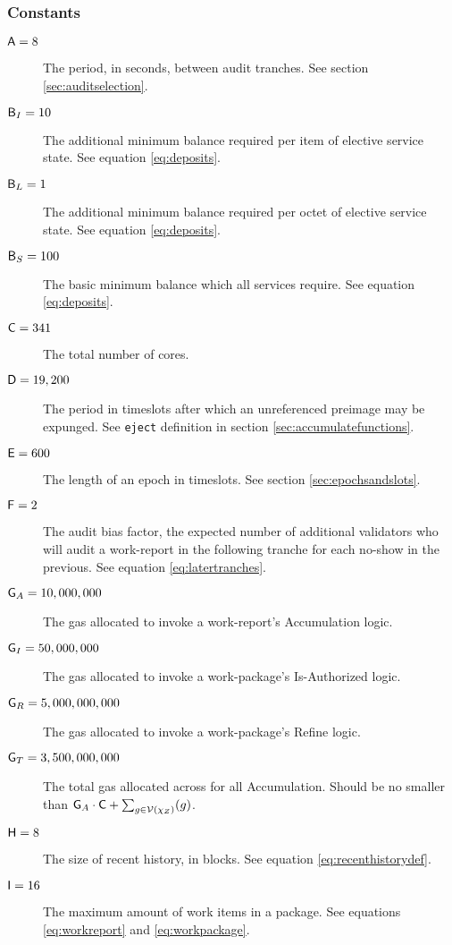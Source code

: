 \subsubsection{Constants}

\begin{description}
  \item[$\mathsf{A} = 8$] The period, in seconds, between audit tranches. See section \ref{sec:auditselection}.
  \item[$\mathsf{B}_I = 10$] The additional minimum balance required per item of elective service state. See equation \ref{eq:deposits}.
  \item[$\mathsf{B}_L = 1$] The additional minimum balance required per octet of elective service state. See equation \ref{eq:deposits}.
  \item[$\mathsf{B}_S = 100$] The basic minimum balance which all services require. See equation \ref{eq:deposits}.
  \item[$\mathsf{C} = 341$] The total number of cores.
  \item[$\mathsf{D} = 19,200$] The period in timeslots after which an unreferenced preimage may be expunged. See \texttt{eject} definition in section \ref{sec:accumulatefunctions}.
  \item[$\mathsf{E} = 600$] The length of an epoch in timeslots. See section \ref{sec:epochsandslots}.
  \item[$\mathsf{F} = 2$] The audit bias factor, the expected number of additional validators who will audit a work-report in the following tranche for each no-show in the previous. See equation \ref{eq:latertranches}.
  \item[$\mathsf{G}_A = 10,000,000$] The gas allocated to invoke a work-report's Accumulation logic.
  \item[$\mathsf{G}_I = 50,000,000$] The gas allocated to invoke a work-package's Is-Authorized logic.
  \item[$\mathsf{G}_R = 5,000,000,000$] The gas allocated to invoke a work-package's Refine logic.
  \item[$\mathsf{G}_T = 3,500,000,000$] The total gas allocated across for all Accumulation. Should be no smaller than $\Creportaccgas\cdot\Ccorecount + \sum_{g \in \values{\alwaysaccers}}(g)$.
  \item[$\mathsf{H} = 8$] The size of recent history, in blocks. See equation \ref{eq:recenthistorydef}.
  \item[$\mathsf{I} = 16$] The maximum amount of work items in a package. See equations \ref{eq:workreport} and \ref{eq:workpackage}.

\end{description}
